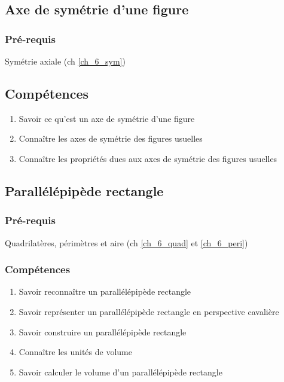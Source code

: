 \subsection{Axe de symétrie d'une figure}\label{ch_6_axe}

\subsubsection*{Pré-requis}

Symétrie axiale (ch \ref{ch_6_sym})

\subsection*{Compétences}

\begin{enumerate}
	\item Savoir ce qu'est un axe de symétrie d'une figure
	\item Connaître les axes de symétrie des figures usuelles
	\item Connaître les propriétés dues aux axes de symétrie des figures usuelles
\end{enumerate}

\subsection{Parallélépipède rectangle}\label{ch_6_pave}

\subsubsection*{Pré-requis}

Quadrilatères, périmètres et aire (ch \ref{ch_6_quad} et \ref{ch_6_peri})

\subsubsection*{Compétences}

\begin{enumerate}
	\item Savoir reconnaître un parallélépipède rectangle
	\item Savoir représenter un parallélépipède rectangle en perspective cavalière  
	\item Savoir construire un parallélépipède rectangle
	\item Connaître les unités de volume
	\item Savoir calculer le volume d'un parallélépipède rectangle

\end{enumerate}

